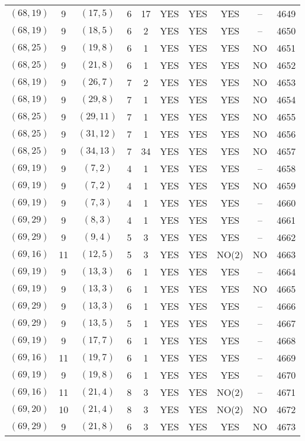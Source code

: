 \begin{longtable}{|c|c|c|c|c|c|c|c|c|c|}
$(68, 19)$ & 9 & $(17, 5)$ & 6 & 17 & YES & YES & YES & -- & 4649\\
$(68, 19)$ & 9 & $(18, 5)$ & 6 & 2 & YES & YES & YES & -- & 4650\\
$(68, 25)$ & 9 & $(19, 8)$ & 6 & 1 & YES & YES & YES & NO & 4651\\
$(68, 25)$ & 9 & $(21, 8)$ & 6 & 1 & YES & YES & YES & NO & 4652\\
$(68, 19)$ & 9 & $(26, 7)$ & 7 & 2 & YES & YES & YES & NO & 4653\\
$(68, 19)$ & 9 & $(29, 8)$ & 7 & 1 & YES & YES & YES & NO & 4654\\
$(68, 25)$ & 9 & $(29, 11)$ & 7 & 1 & YES & YES & YES & NO & 4655\\
$(68, 25)$ & 9 & $(31, 12)$ & 7 & 1 & YES & YES & YES & NO & 4656\\
$(68, 25)$ & 9 & $(34, 13)$ & 7 & 34 & YES & YES & YES & NO & 4657\\
$(69, 19)$ & 9 & $(7, 2)$ & 4 & 1 & YES & YES & YES & -- & 4658\\
$(69, 19)$ & 9 & $(7, 2)$ & 4 & 1 & YES & YES & YES & NO & 4659\\
$(69, 19)$ & 9 & $(7, 3)$ & 4 & 1 & YES & YES & YES & -- & 4660\\
$(69, 29)$ & 9 & $(8, 3)$ & 4 & 1 & YES & YES & YES & -- & 4661\\
$(69, 29)$ & 9 & $(9, 4)$ & 5 & 3 & YES & YES & YES & -- & 4662\\
$(69, 16)$ & 11 & $(12, 5)$ & 5 & 3 & YES & YES & NO(2) & NO & 4663\\
$(69, 19)$ & 9 & $(13, 3)$ & 6 & 1 & YES & YES & YES & -- & 4664\\
$(69, 19)$ & 9 & $(13, 3)$ & 6 & 1 & YES & YES & YES & NO & 4665\\
$(69, 29)$ & 9 & $(13, 3)$ & 6 & 1 & YES & YES & YES & -- & 4666\\
$(69, 29)$ & 9 & $(13, 5)$ & 5 & 1 & YES & YES & YES & -- & 4667\\
$(69, 19)$ & 9 & $(17, 7)$ & 6 & 1 & YES & YES & YES & -- & 4668\\
$(69, 16)$ & 11 & $(19, 7)$ & 6 & 1 & YES & YES & YES & -- & 4669\\
$(69, 19)$ & 9 & $(19, 8)$ & 6 & 1 & YES & YES & YES & -- & 4670\\
$(69, 16)$ & 11 & $(21, 4)$ & 8 & 3 & YES & YES & NO(2) & -- & 4671\\
$(69, 20)$ & 10 & $(21, 4)$ & 8 & 3 & YES & YES & NO(2) & NO & 4672\\
$(69, 29)$ & 9 & $(21, 8)$ & 6 & 3 & YES & YES & YES & NO & 4673\\

\end{longtable}
